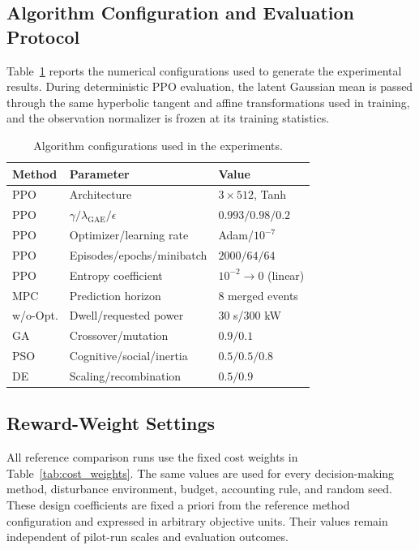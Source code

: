 \documentclass[conference]{IEEEtran}
\begin{document}
\subsection{Algorithm Configuration and Evaluation Protocol}
Table~\ref{tab:algorithm_settings} reports the numerical configurations used to generate the experimental results. During deterministic PPO evaluation, the latent Gaussian mean is passed through the same hyperbolic tangent and affine transformations used in training, and the observation normalizer is frozen at its training statistics.

\begin{table}[t]
\centering
\caption{Algorithm configurations used in the experiments.}
\label{tab:algorithm_settings}
\footnotesize
\setlength{\tabcolsep}{3pt}
\begin{tabular}{lll}
\toprule
Method & Parameter & Value \\
\midrule
PPO & Architecture & $3\times512$, Tanh \\
PPO & $\gamma/\lambda_{\mathrm{GAE}}/\epsilon$ & $0.993/0.98/0.2$ \\
PPO & Optimizer/learning rate & Adam/$10^{-7}$ \\
PPO & Episodes/epochs/minibatch & $2000/64/64$ \\
PPO & Entropy coefficient & $10^{-2}\rightarrow0$ (linear) \\
MPC & Prediction horizon & 8 merged events \\
w/o-Opt. & Dwell/requested power & 30 s/300 kW \\
GA & Crossover/mutation & $0.9/0.1$ \\
PSO & Cognitive/social/inertia & $0.5/0.5/0.8$ \\
DE & Scaling/recombination & $0.5/0.9$ \\
\bottomrule
\end{tabular}
\end{table}

\subsection{Reward-Weight Settings}
All reference comparison runs use the fixed cost weights in Table~\ref{tab:cost_weights}. The same values are used for every decision-making method, disturbance environment, budget, accounting rule, and random seed. These design coefficients are fixed a priori from the reference method configuration and expressed in arbitrary objective units. Their values remain independent of pilot-run scales and evaluation outcomes.
\end{document}
